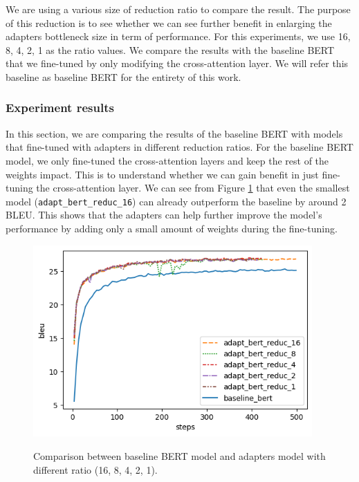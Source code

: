 We are using a various size of reduction ratio to compare the result. The purpose of this reduction is to see whether we can see further benefit in enlarging the adapters bottleneck size in term of performance. For this experiments, we use 16, 8, 4, 2, 1 as the ratio values. We compare the results with the baseline BERT that we fine-tuned by only modifying the cross-attention layer. We will refer this baseline as baseline BERT for the entirety of this work.

\subsubsection{Experiment results}
In this section, we are comparing the results of the baseline BERT with models that fine-tuned with adapters in different reduction ratios. For the baseline BERT model, we only fine-tuned the cross-attention layers and keep the rest of the weights impact. This is to understand whether we can gain benefit in just fine-tuning the cross-attention layer. We can see from Figure \ref{img:adapt_bert_ratio} that even the smallest model (\texttt{adapt\_bert\_reduc\_16}) can already outperform the baseline by around 2 BLEU. This shows that the adapters can help further improve the model's performance by adding only a small amount of weights during the fine-tuning.

\begin{figure}[]
    {\includegraphics[width=0.95\textwidth]{img/adapter_bert_baseline_adapters.png}}
    \centering
    \caption{Comparison between baseline BERT model and adapters model with different ratio (16, 8, 4, 2, 1).}
    \label{img:adapt_bert_ratio}
\end{figure}

